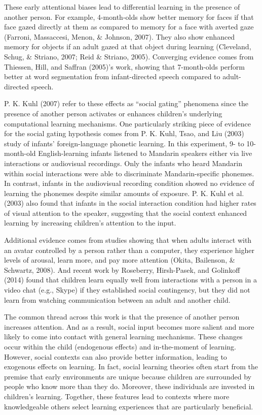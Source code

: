\documentclass[english,floatsintext,man]{apa6}
\theoremstyle{definition}
\theoremstyle{definition}
\theoremstyle{definition}
\theoremstyle{remark}
\begin{document}
These early attentional biases lead to differential learning in the
presence of another person. For example, 4-month-olds show better memory
for faces if that face gazed directly at them as compared to memory for
a face with averted gaze (Farroni, Massaccesi, Menon, \& Johnson, 2007).
They also show enhanced memory for objects if an adult gazed at that
object during learning (Cleveland, Schug, \& Striano, 2007; Reid \&
Striano, 2005). Converging evidence comes from Thiessen, Hill, and
Saffran (2005)'s work, showing that 7-month-olds perform better at word
segmentation from infant-directed speech compared to adult-directed
speech.

P. K. Kuhl (2007) refer to these effects as \enquote{social gating}
phenomena since the presence of another person activates or enhances
children's underlying computational learning mechanisms. One
particularly striking piece of evidence for the social gating hypothesis
comes from P. K. Kuhl, Tsao, and Liu (2003) study of infants'
foreign-language phonetic learning. In this experiment, 9- to
10-month-old English-learning infants listened to Mandarin speakers
either via live interactions or audiovisual recordings. Only the infants
who heard Mandarin within social interactions were able to discriminate
Mandarin-specific phonemes. In contrast, infants in the audiovisual
recording condition showed no evidence of learning the phonemes despite
similar amounts of exposure. P. K. Kuhl et al. (2003) also found that
infants in the social interaction condition had higher rates of visual
attention to the speaker, suggesting that the social context enhanced
learning by increasing children's attention to the input.

Additional evidence comes from studies showing that when adults interact
with an avatar controlled by a person rather than a computer, they
experience higher levels of arousal, learn more, and pay more attention
(Okita, Bailenson, \& Schwartz, 2008). And recent work by Roseberry,
Hirsh-Pasek, and Golinkoff (2014) found that children learn equally well
from interactions with a person in a video chat (e.g., Skype) if they
established social contingency, but they did not learn from watching
communication between an adult and another child.

The common thread across this work is that the presence of another
person increases attention. And as a result, social input becomes more
salient and more likely to come into contact with general learning
mechanisms. These changes occur within the child (endogenous effects)
and in-the-moment of learning. However, social contexts can also provide
better information, leading to exogenous effects on learning. In fact,
social learning theories often start from the premise that early
environments are unique because children are surrounded by people who
know more than they do. Moreover, these individuals are invested in
children's learning. Together, these features lead to contexts where
more knowledgeable others select learning experiences that are
particularly beneficial.
\end{document}
